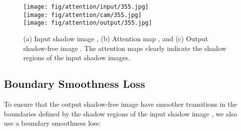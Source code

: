 \documentclass[10pt,twocolumn,letterpaper]{article}
\begin{document}
 
\begin{figure}[t]
	\centering
	\captionsetup[subfigure]{labelformat=empty}
	\captionsetup[subfloat]{farskip=2pt}
	\hspace{0.08cm}
	{\texttt{[image: fig/attention/input/355.jpg]}}\hfill
	\hfill
	\hfill
	\hfill
	\hfill\\
	\vspace{-0.015in}	
	\hspace{0.08cm}
	{\texttt{[image: fig/attention/cam/355.jpg]}}\hfill
	\hfill
	\hfill
	\hfill
	\hfill\\
	\vspace{-0.015in}
	\hspace{0.08cm}
	{\texttt{[image: fig/attention/output/355.jpg]}}\hfill
	\hfill
	\hfill
	\hfill
	\hfill\\	
	\caption{ (a) Input shadow image , (b) Attention map , and (c) Output shadow-free image . The attention maps clearly indicate the shadow regions of the input shadow images.}
\label{fig:attentionmaps}
\end{figure}

\subsection{Boundary Smoothness Loss}
To ensure that the output shadow-free image  have smoother transitions in the boundaries defined by the shadow regions of the input shadow image , we also use a boundary smoothness loss:
\end{document}
